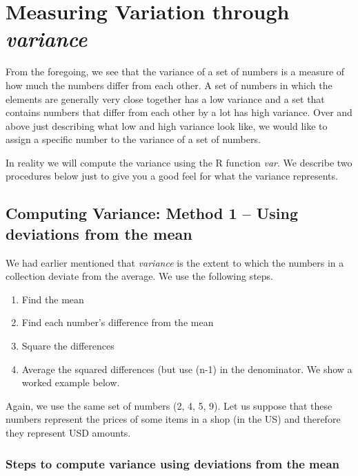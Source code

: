 \documentclass[
  12pt,
  letterpaper,
  DIV=11,
  numbers=noendperiod]{scrreprt}
\begin{document}
\section{\texorpdfstring{Measuring Variation through
\emph{variance}}{Measuring Variation through variance}}\label{measuring-variation-through-variance}

From the foregoing, we see that the variance of a set of numbers is a
measure of how much the numbers differ from each other. A set of numbers
in which the elements are generally very close together has a low
variance and a set that contains numbers that differ from each other by
a lot has high variance. Over and above just describing what low and
high variance look like, we would like to assign a specific number to
the variance of a set of numbers.

In reality we will compute the variance using the R function \emph{var}.
We describe two procedures below just to give you a good feel for what
the variance represents.

\subsection{Computing Variance: Method 1 -- Using deviations from the
mean}\label{computing-variance-method-1-using-deviations-from-the-mean}

We had earlier mentioned that \emph{variance} is the extent to which the
numbers in a collection deviate from the average. We use the following
steps.

\begin{enumerate}
\def\labelenumi{\arabic{enumi}.}
\item
  Find the mean
\item
  Find each number's difference from the mean
\item
  Square the differences
\item
  Average the squared differences (but use (n-1) in the denominator. We
  show a worked example below.
\end{enumerate}

Again, we use the same set of numbers (2, 4, 5, 9). Let us suppose that
these numbers represent the prices of some items in a shop (in the US)
and therefore they represent USD amounts.

\subsubsection{Steps to compute variance using deviations from the
mean}\label{steps-to-compute-variance-using-deviations-from-the-mean}
\end{document}
